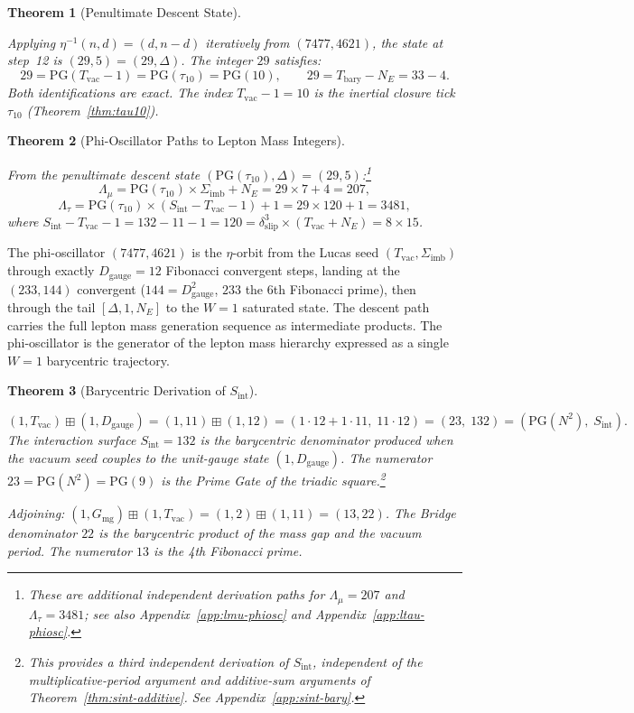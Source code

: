 \documentclass[11pt, letterpaper]{article}
\newcommand{\aop}{\eta}
\newcommand{\bplus}{\boxplus}
\newcommand{\Tbary}{T_{\mathrm{bary}}}
\newcommand{\Dg}{D_{\mathrm{gauge}}}
\newcommand{\Sint}{S_{\mathrm{int}}}
\newcommand{\Sigimb}{\Sigma_{\mathrm{imb}}}
\newcommand{\PG}{\mathrm{PG}}
\theoremstyle{definition}
\theoremstyle{plain}
\newtheorem{theorem}{Theorem}[section]
\begin{document}
\begin{theorem}[Penultimate Descent State]\label{thm:descent-state}
\begin{rsbox}
Applying $\aop^{-1}(n,d)=(d,n-d)$ iteratively from $(7477,4621)$, the state
at step~12 is $(29,5)=(29,\Delta)$.  The integer $29$ satisfies:
\[
29 = \PG(T_{\mathrm{vac}}-1) = \PG(\tau_{10}) = \PG(10), \qquad
29 = \Tbary-N_E = 33-4.
\]
Both identifications are exact.  The index $T_{\mathrm{vac}}-1=10$ is the
inertial closure tick $\tau_{10}$ (Theorem~\ref{thm:tau10}).
\end{rsbox}
\end{theorem}

\begin{theorem}[Phi-Oscillator Paths to Lepton Mass Integers]
\label{thm:phi-lepton}
\begin{rsbox}
From the penultimate descent state
$(\PG(\tau_{10}),\Delta)=(29,5)$:\footnote{These are additional independent
derivation paths for $\Lambda_\mu=207$ and $\Lambda_\tau=3481$; see also
Appendix~\ref{app:lmu-phiosc} and Appendix~\ref{app:ltau-phiosc}.}
\[
\Lambda_\mu = \PG(\tau_{10})\times\Sigimb+N_E = 29\times 7+4 = 207,
\]
\[
\Lambda_\tau = \PG(\tau_{10})\times(\Sint-T_{\mathrm{vac}}-1)+1
             = 29\times 120+1 = 3481,
\]
where $\Sint-T_{\mathrm{vac}}-1=132-11-1=120=\delta_{\mathrm{slip}}^3
\times(T_{\mathrm{vac}}+N_E)=8\times 15$.
\end{rsbox}
\end{theorem}

\begin{observebox}
The phi-oscillator $(7477,4621)$ is the $\aop$-orbit from the Lucas seed
$(T_{\mathrm{vac}},\Sigimb)$ through exactly $\Dg=12$ Fibonacci convergent
steps, landing at the $(233,144)$ convergent ($144=\Dg^2$, $233$ the 6th
Fibonacci prime), then through the tail $[\Delta,1,N_E]$ to the $W=1$
saturated state.  The descent path carries the full lepton mass generation
sequence as intermediate products.  The phi-oscillator is the generator of
the lepton mass hierarchy expressed as a single $W=1$ barycentric trajectory.
\end{observebox}

\begin{theorem}[Barycentric Derivation of $\Sint$]\label{thm:sint-bary}
\begin{rsbox}
\[
(1,T_{\mathrm{vac}})\bplus(1,\Dg)
= (1,11)\bplus(1,12)
= (1\cdot 12+1\cdot 11,\;11\cdot 12)
= (23,\;132)
= (\PG(N^2),\;\Sint).
\]
The interaction surface $\Sint=132$ is the barycentric denominator produced
when the vacuum seed couples to the unit-gauge state $(1,\Dg)$.  The
numerator $23=\PG(N^2)=\PG(9)$ is the Prime Gate of the triadic
square.\footnote{This provides a third independent derivation of $\Sint$,
independent of the multiplicative-period argument and additive-sum arguments of
Theorem~\ref{thm:sint-additive}.  See Appendix~\ref{app:sint-bary}.}

Adjoining: $(1,G_{\mathrm{mg}})\bplus(1,T_{\mathrm{vac}})
=(1,2)\bplus(1,11)=(13,22)$.  The Bridge denominator $22$ is the barycentric
product of the mass gap and the vacuum period.  The numerator $13$ is the
4th Fibonacci prime.
\end{rsbox}
\end{theorem}
\end{document}
